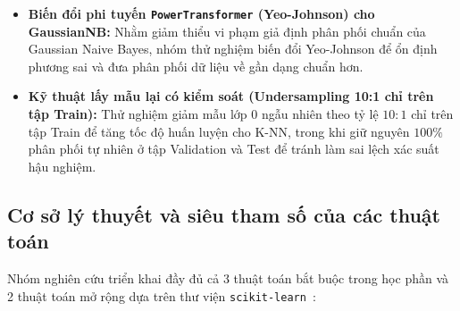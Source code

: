\documentclass[13pt,a4paper]{extarticle}
\begin{document}
\begin{itemize}
\begin{itemize}
        \item \textbf{Biến đổi phi tuyến \texttt{PowerTransformer} (Yeo-Johnson) cho GaussianNB:} Nhằm giảm thiểu vi phạm giả định phân phối chuẩn của Gaussian Naive Bayes, nhóm thử nghiệm biến đổi Yeo-Johnson để ổn định phương sai và đưa phân phối dữ liệu về gần dạng chuẩn hơn.
        \item \textbf{Kỹ thuật lấy mẫu lại có kiểm soát (Undersampling 10:1 chỉ trên tập Train):} Thử nghiệm giảm mẫu lớp 0 ngẫu nhiên theo tỷ lệ $10 : 1$ chỉ trên tập Train để tăng tốc độ huấn luyện cho K-NN, trong khi giữ nguyên $100\%$ phân phối tự nhiên ở tập Validation và Test để tránh làm sai lệch xác suất hậu nghiệm.
    \end{itemize}
\end{itemize}

\subsection{Cơ sở lý thuyết và siêu tham số của các thuật toán}
Nhóm nghiên cứu triển khai đầy đủ cả 3 thuật toán bắt buộc trong học phần và 2 thuật toán mở rộng dựa trên thư viện \texttt{scikit-learn}~\cite{pedregosa2011scikit}:
\end{document}
